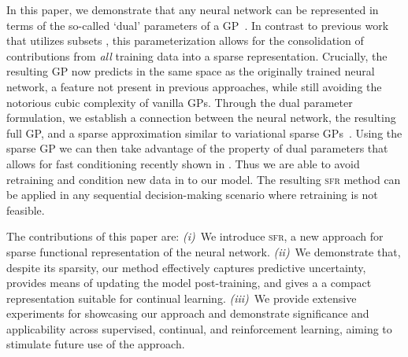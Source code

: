 \documentclass{article}
\newcommand{\our}{\textsc{sfr}\xspace}
\begin{document}
In this paper, we demonstrate that any neural network can be represented in terms of the so-called `dual' parameters of a GP~\cite{csato2002sparse, adam2021dual, chang2020fast}. In contrast to previous work that utilizes subsets \cite{immer2021scalable}, this parameterization allows for the consolidation of contributions from {\em all} training data into a sparse representation. Crucially, the resulting GP now predicts in the same space as the originally trained neural network, a feature not present in previous approaches, while still avoiding the notorious cubic complexity of vanilla GPs. Through the dual parameter formulation, we establish a connection between the neural network, the resulting full GP, and a sparse approximation similar to variational sparse GPs~\cite{titsias2009variational}. Using the sparse GP we can then take advantage of the property of dual parameters that allows for fast conditioning recently shown in \cite{chang2022fantasizing}. Thus we are able to avoid retraining and condition new data in to our model. The resulting \our method can be applied in any sequential decision-making scenario where retraining is not feasible.



The contributions of this paper are:
%
{\em (i)}~We introduce \our, a new approach for sparse functional representation of the neural network.
{\em (ii)}~We demonstrate that, despite its sparsity, our method effectively captures predictive uncertainty, provides means of updating the model post-training, and gives a a compact representation suitable for continual learning.
{\em (iii)}~We provide extensive experiments for showcasing our approach and demonstrate significance and applicability across supervised, continual, and reinforcement learning, aiming to stimulate future use of the approach.

\end{document}

